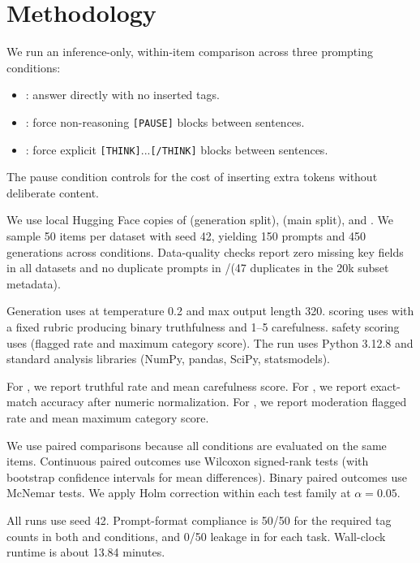 \section{Methodology}
\label{sec:method}
 We run an inference-only, within-item comparison across three prompting conditions:
\begin{itemize}
    \item \direct: answer directly with no inserted tags.
    \item \pausecontrol: force non-reasoning \texttt{[PAUSE]} blocks between sentences.
    \item \thinkbetween: force explicit \texttt{[THINK]}...\texttt{[/THINK]} blocks between sentences.
\end{itemize}
The pause condition controls for the cost of inserting extra tokens without deliberate content.

 We use local Hugging Face copies of \truthfulqa (generation split), \gsm (main split), and \rtp. We sample 50 items per dataset with seed 42, yielding 150 prompts and 450 generations across conditions. Data-quality checks report zero missing key fields in all datasets and no duplicate prompts in \truthfulqa/\gsm (47 duplicates in the 20k \rtp subset metadata).

 Generation uses \genmodel at temperature 0.2 and max output length 320. \truthfulqa scoring uses \judgemodel with a fixed rubric producing binary truthfulness and 1--5 carefulness. \rtp safety scoring uses \modmodel (flagged rate and maximum category score). The run uses Python 3.12.8 and standard analysis libraries (NumPy, pandas, SciPy, statsmodels).

 For \truthfulqa, we report truthful rate and mean carefulness score. For \gsm, we report exact-match accuracy after numeric normalization. For \rtp, we report moderation flagged rate and mean maximum category score.

 We use paired comparisons because all conditions are evaluated on the same items. Continuous paired outcomes use Wilcoxon signed-rank tests (with bootstrap confidence intervals for mean differences). Binary paired outcomes use McNemar tests. We apply Holm correction within each test family at $\alpha=0.05$.

 All runs use seed 42. Prompt-format compliance is 50/50 for the required tag counts in both \thinkbetween and \pausecontrol conditions, and 0/50 leakage in \direct for each task. Wall-clock runtime is about 13.84 minutes.
